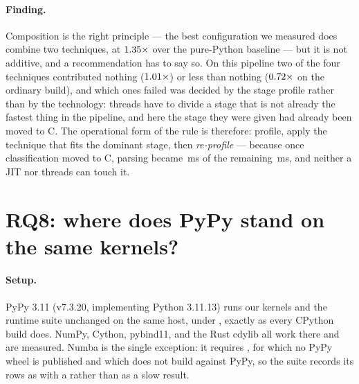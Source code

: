 \paragraph{Finding.} Composition is the right principle --- the best
configuration we measured does combine two techniques, at $\meas{ratio:b7_pipeline-gil:end_to_end/gil/v0_pure|b7_pipeline-gil:end_to_end/gil/v2_numba_native}{1.35}\times$ over the pure-Python
baseline --- but it is not additive, and a recommendation has to say so. On this pipeline two of
the four techniques contributed nothing ($\meas{ratio:b7_pipeline-gil:end_to_end/gil/v0_pure|b7_pipeline-gil:end_to_end/gil/v1_numba}{1.01}\times$) or less than nothing ($\meas{ratio:b7_pipeline-gil:end_to_end/gil/v0_pure|b7_pipeline-gil:end_to_end/gil/v3_native_threads}{0.72}\times$ on the
ordinary build), and which ones failed was decided by the stage profile rather than by the
technology: threads have to divide a stage that is not already the fastest thing in the
pipeline, and here the stage they were given had already been moved to C. The operational form
of the rule is therefore: profile, apply the technique that fits the dominant stage, then
\emph{re-profile} --- because once classification moved to C, parsing became \,ms of the
remaining \,ms, and neither a JIT nor threads can touch it.

\section{RQ8: where does PyPy stand on the same kernels?}
\label{sec:rq8}


\paragraph{Setup.} PyPy 3.11 (v7.3.20, implementing Python 3.11.13) runs our kernels and the
runtime suite unchanged on the same host, under , exactly as every CPython build
does. NumPy, Cython, pybind11,  and the Rust cdylib all work there and are
measured. Numba is the single exception: it requires , for which no PyPy wheel is
published and which does not build against PyPy, so the suite records its rows as
 with a  rather than as a slow result.

